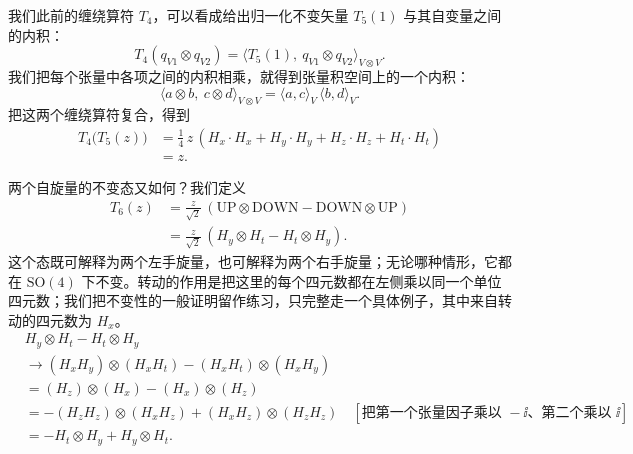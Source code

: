 我们此前的缠绕算符 $T_4$，可以看成给出归一化不变矢量 $T_5(1)$ 与其自变量之间的内积：
\begin{equation*}
T_4(q_{V1}\otimes q_{V2})=\bigl\langle T_5(1),\ q_{V1}\otimes q_{V2}\bigr\rangle_{V\otimes V}.
\end{equation*}
我们把每个张量中各项之间的内积相乘，就得到张量积空间上的一个内积：
\begin{equation*}
\langle a\otimes b,\ c\otimes d\rangle_{V\otimes V}=\langle a,c\rangle_V\,\langle b,d\rangle_V .
\end{equation*}
把这两个缠绕算符复合，得到
\begin{align*}
T_4\bigl(T_5(z)\bigr)
&= \tfrac14\,z\,(H_x\cdot H_x+H_y\cdot H_y+H_z\cdot H_z+H_t\cdot H_t)\\
&= z .
\end{align*}

两个自旋量的不变态又如何？我们定义
\begin{align*}
T_6(z) &= \frac{z}{\sqrt2}\,(\text{UP}\otimes\text{DOWN}-\text{DOWN}\otimes\text{UP})\\
&= \frac{z}{\sqrt2}\,(H_y\otimes H_t-H_t\otimes H_y).
\end{align*}
这个态既可解释为两个左手旋量，也可解释为两个右手旋量；无论哪种情形，它都在 $\mathrm{SO}(4)$ 下不变。转动的作用是把这里的每个四元数都在左侧乘以同一个单位四元数；我们把不变性的一般证明留作练习，只完整走一个具体例子，其中来自转动的四元数为 $H_x$。
\begin{align*}
& H_y\otimes H_t-H_t\otimes H_y\\
&\to (H_x H_y)\otimes(H_x H_t)-(H_x H_t)\otimes(H_x H_y)\\
&= (H_z)\otimes(H_x)-(H_x)\otimes(H_z)\\
&= -(H_z H_z)\otimes(H_x H_z)+(H_x H_z)\otimes(H_z H_z)
\quad[\text{把第一个张量因子乘以 }-\ii\text{、第二个乘以 }\ii]\\
&= -H_t\otimes H_y+H_y\otimes H_t .
\end{align*}

